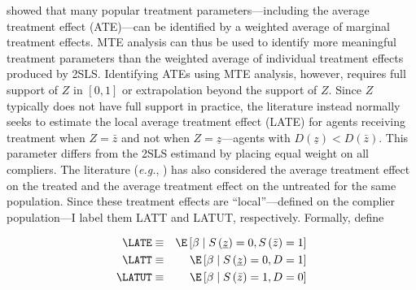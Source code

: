 \citet{heckman1999local,heckman2005structural} showed that many popular
treatment parameters---including the average treatment effect (ATE)---can
be identified by a weighted average of marginal treatment effects.
MTE analysis can thus be used to identify more meaningful treatment
parameters than the weighted average of individual treatment effects
produced by 2SLS. Identifying ATEs using MTE analysis, however, requires
full support of $Z$ in $\left[0,1\right]$ or extrapolation beyond
the support of $Z$. Since $Z$ typically does not have full support
in practice, the literature instead normally seeks to estimate the
local average treatment effect (LATE) for agents receiving treatment
when $Z=\bar{z}$ and not when $Z=\underline{z}$---agents with $D\left(\underline{z}\right)<D\left(\bar{z}\right)$.
This parameter differs from the 2SLS estimand by placing equal weight
on all compliers. The literature (\emph{e.g.}, \citealt{Bhuller2020Incarceration})
has also considered the average treatment effect on the treated and
the average treatment effect on the untreated for the same population.
Since these treatment effects are ``local''---defined on the complier
population---I label them LATT and LATUT, respectively. Formally,
define

\begin{eqnarray*}
\LATE & \equiv & \E\left[\beta\mid S\left(\underline{z}\right)=0,S\left(\bar{z}\right)=1\right]\\
\LATT & \equiv & \E\left[\beta\mid S\left(\underline{z}\right)=0,D=1\right]\\
\LATUT & \equiv & \E\left[\beta\mid S\left(\bar{z}\right)=1,D=0\right]
\end{eqnarray*}

